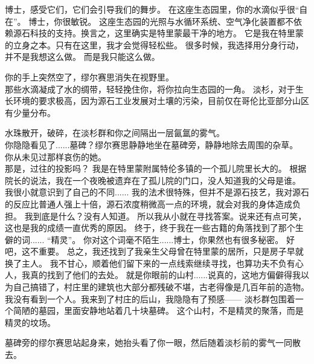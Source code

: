 \documentclass[openany]{book}
\begin{document}
\begin{dialogue}
     博士，感受它们，它们会引导我们的舞步。
     在这座生态园里，你的水滴似乎很“自在”。
     博士，你很敏锐。
     这座生态园的光照与水循环系统、空气净化装置都不依赖源石科技的支持。换言之，这里确实是特里蒙最干净的地方。
     它是我在特里蒙的立身之本。只有在这里，我才会觉得轻松些。
     很多时候，我选择用分身行动，并不是我想这么做。
     而是我只能这么做。\par
    你的手上突然空了，缪尔赛思消失在视野里。\\
    那些水滴凝成了水的绸带，轻轻挽住你，将你拉向生态园的一角。
     淡杉，对于生长环境的要求极高，因为源石工业发展对土壤的污染，目前仅在哥伦比亚部分山区有少量分布。\par
    水珠散开，破碎，在淡杉群和你之间隔出一层氤氲的雾气。\\
    你隐隐看见了......墓碑？缪尔赛思静静地坐在墓碑旁，静静地除去周围的杂草。\\
    你从未见过那样哀伤的她。\\
    那是，过往的投影吗？
     我是在特里蒙附属特伦多镇的一个孤儿院里长大的。
     根据院长的说法，我在一个夜晚被遗弃在了孤儿院的门口，没人知道我的父母是谁。
     我很小就意识到了自己的不同......
     我的法术很特殊，但并不是源石技艺，我对源石的反应比普通人强上十倍，源石浓度稍微高一点的环境，就会对我的身体造成负担。
     我到底是什么？没有人知道。
     所以我从小就在寻找答案。说来还有点可笑，这也是我的成绩一直优秀的原因。
     终于，终于我在一些古籍的角落找到了那个生僻的词......
     “精灵”。
     你对这个词毫不陌生......博士，你果然也有很多秘密。
     好吧，这不重要。
     总之，我还找到了我亲生父母曾在特里蒙的居所，只是房子早就换了主人。
     我不甘心，顺着他们留下来的一点线索继续寻找，也算功夫不负有心人，我真的找到了他们的去处。
     就是你眼前的山村......说真的，这地方偏僻得我以为自己搞错了，村庄里的建筑也大部分都残破不堪，古老得像是几百年前的造物。
     我没有看到一个人。我来到了村庄的后山，我隐隐有了预感——
     淡杉群包围着一个简陋的墓园，里面安静地站着几十块墓碑。
     这个山村，不是精灵的聚落，而是精灵的坟场。\par
    墓碑旁的缪尔赛思站起身来，她抬头看了你一眼，然后随着淡杉前的雾气一同散去。\\

\end{dialogue}
\end{document}
